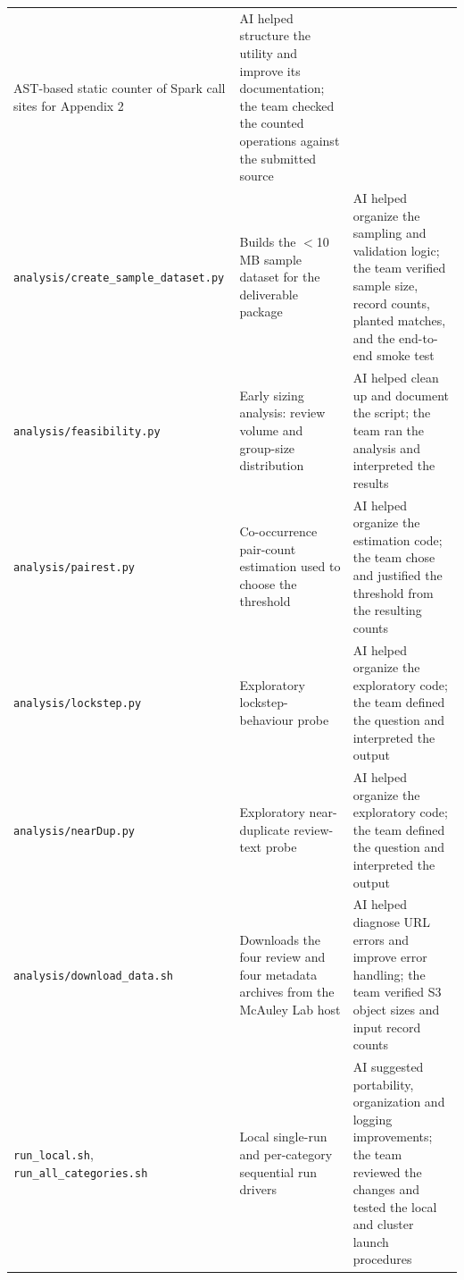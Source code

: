 \documentclass[12pt]{article}
\begin{document}
{\begin{longtable}{@{}p{1.6in}p{2.05in}p{2.05in}@{}}
    AST-based static counter of Spark call sites for Appendix 2 &
    AI helped structure the utility and improve its documentation; the team
    checked the counted operations against the submitted source \\
  \addlinespace
  \texttt{analysis/}\allowbreak\texttt{create\_sample\_}\allowbreak\texttt{dataset.py} &
    Builds the $<$10\,MB sample dataset for the deliverable package &
    AI helped organize the sampling and validation logic; the team verified
    sample size, record counts, planted matches, and the end-to-end smoke test \\
  \addlinespace
  \texttt{analysis/}\allowbreak\texttt{feasibility.py} &
    Early sizing analysis: review volume and group-size distribution &
    AI helped clean up and document the script; the team ran the analysis and
    interpreted the results \\
  \addlinespace
  \texttt{analysis/}\allowbreak\texttt{pairest.py} &
    Co-occurrence pair-count estimation used to choose the threshold &
    AI helped organize the estimation code; the team chose and justified the
    threshold from the resulting counts \\
  \addlinespace
  \texttt{analysis/}\allowbreak\texttt{lockstep.py} &
    Exploratory lockstep-behaviour probe & AI helped organize the exploratory
    code; the team defined the question and interpreted the output \\
  \addlinespace
  \texttt{analysis/}\allowbreak\texttt{nearDup.py} &
    Exploratory near-duplicate review-text probe & AI helped organize the
    exploratory code; the team defined the question and interpreted the output \\
  \addlinespace
  \texttt{analysis/}\allowbreak\texttt{download\_data.sh} &
    Downloads the four review and four metadata archives from the McAuley Lab
    host & AI helped diagnose URL errors and improve error handling; the team
    verified S3 object sizes and input record counts \\
  \addlinespace
  \texttt{run\_local.sh},\newline
  \texttt{run\_all\_}\allowbreak\texttt{categories.sh} &
    Local single-run and per-category sequential run drivers &
    AI suggested portability, organization and logging improvements; the team
    reviewed the changes and tested the local and cluster launch procedures \\
  \bottomrule
\end{longtable}
}

\end{document}
